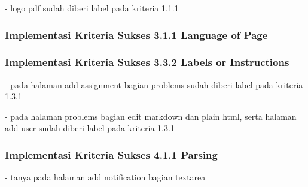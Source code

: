 - logo pdf sudah diberi label pada kriteria 1.1.1

\subsubsection{Implementasi Kriteria Sukses 3.1.1 Language of Page}
\label{subsubsec:implementasi_A_3.1.1}

\subsubsection{Implementasi Kriteria Sukses 3.3.2 Labels or Instructions}
\label{subsubsec:implementasi_A_3.3.2}

- pada halaman add assignment bagian problems sudah diberi label pada kriteria 1.3.1

- pada halaman problems bagian edit markdown dan plain html, serta halaman add user sudah diberi label pada kriteria 1.3.1

\subsubsection{Implementasi Kriteria Sukses 4.1.1 Parsing}
\label{subsubsec:implementasi_A_4.1.1}

- tanya pada halaman add notification bagian textarea